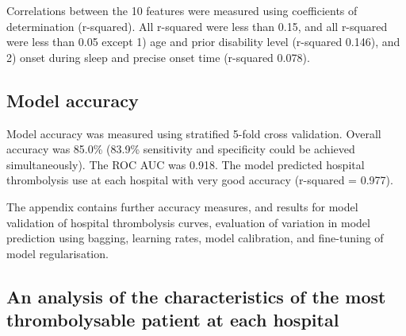 Correlations between the 10 features were measured using coefficients of determination (r-squared). All r-squared were less than 0.15, and all r-squared were less than 0.05 except 1) age and prior disability level (r-squared 0.146), and 2) onset during sleep and precise onset time (r-squared 0.078).


\subsection{Model accuracy}

Model accuracy was measured using stratified 5-fold cross validation. Overall accuracy was 85.0\% (83.9\% sensitivity and specificity could be achieved simultaneously). The ROC AUC was 0.918. The model predicted hospital thrombolysis use at each hospital with very good accuracy (r-squared = 0.977).

The appendix contains further accuracy measures, and results for model validation of hospital thrombolysis curves, evaluation of variation in model prediction using bagging, learning rates, model calibration, and fine-tuning of model regularisation.


\subsection{An analysis of the characteristics of the most thrombolysable patient at each hospital}

